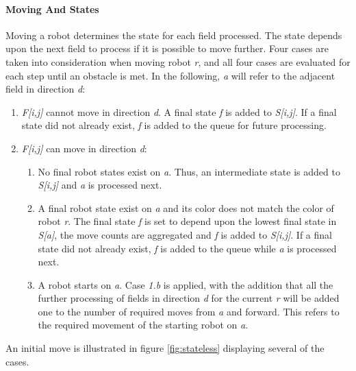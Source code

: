 \documentclass[]{article}
\providecommand{\tightlist}{%
  \setlength{\itemsep}{0pt}\setlength{\parskip}{0pt}}
\let\oldparagraph\paragraph
\renewcommand{\paragraph}[1]{\oldparagraph{#1}\mbox{}}
\begin{document}
\paragraph{Moving And States}\label{moving-and-states}

Moving a robot determines the state for each field processed. The state
depends upon the next field to process if it is possible to move
further. Four cases are taken into consideration when moving robot
\emph{r}, and all four cases are evaluated for each step until an
obstacle is met. In the following, \emph{a} will refer to the adjacent
field in direction \emph{d}:

\begin{enumerate}
\def\labelenumi{\arabic{enumi}.}
\tightlist
\item
  \emph{F{[}i,j{]}} cannot move in direction \emph{d}. A final state
  \emph{f} is added to \emph{S{[}i,j{]}}. If a final state did not
  already exist, \emph{f} is added to the queue for future processing.
\item
  \emph{F{[}i,j{]}} can move in direction \emph{d}:

  \begin{enumerate}
  \def\labelenumii{\alph{enumii}.}
  \tightlist
  \item
    No final robot states exist on \emph{a}. Thus, an intermediate state
    is added to \emph{S{[}i,j{]}} and \emph{a} is processed next.
  \item
    A final robot state exist on \emph{a} and its color does not match
    the color of robot \emph{r}. The final state \emph{f} is set to
    depend upon the lowest final state in \emph{S{[}a{]}}, the move
    counts are aggregated and \emph{f} is added to \emph{S{[}i,j{]}}. If
    a final state did not already exist, \emph{f} is added to the queue
    while \emph{a} is processed next.
  \item
    A robot starts on \emph{a}. Case \emph{1.b} is applied, with the
    addition that all the further processing of fields in direction
    \emph{d} for the current \emph{r} will be added one to the number of
    required moves from \emph{a} and forward. This refers to the
    required movement of the starting robot on \emph{a}.
  \end{enumerate}
\end{enumerate}

An initial move is illustrated in figure \ref{fig:stateless} displaying
several of the cases.
\end{document}
